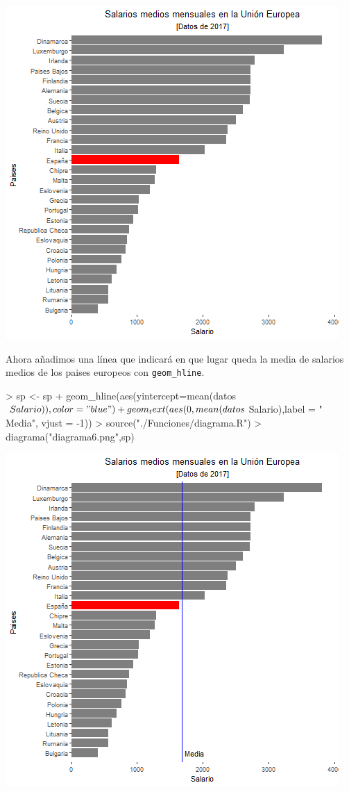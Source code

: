 \documentclass [a4paper] {article}
\begin{document}
\includegraphics[width=\textwidth]{diagrama5}

\bigskip
Ahora añadimos una línea que indicará en que lugar queda la media de salarios medios de los paises europeos con
\texttt{geom\_hline}.
\begin{Schunk}
\begin{Sinput}
> sp <- sp + geom_hline(aes(yintercept=mean(datos$Salario)),color = "blue") + geom_text(aes(0,mean(datos$Salario),label = "            Media", vjust = -1))
> source("./Funciones/diagrama.R")
> diagrama("diagrama6.png",sp)
\end{Sinput}
\end{Schunk}

\includegraphics[width=\textwidth]{diagrama6}
\end{document}
